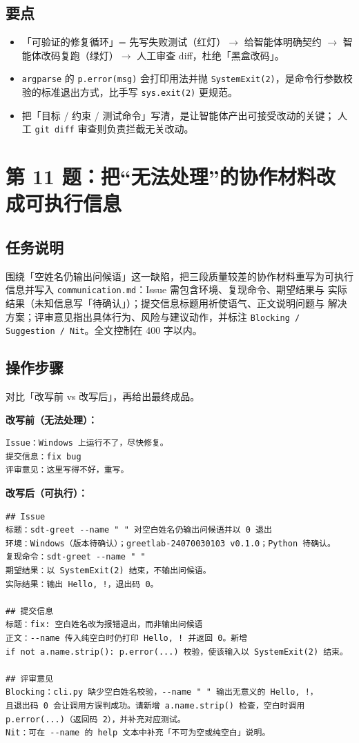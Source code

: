 \documentclass{hamesome-report}
\begin{document}
\subsection{要点}
\begin{itemize}
\item 「可验证的修复循环」= 先写失败测试（红灯）$\to$ 给智能体明确契约
  $\to$ 智能体改码复跑（绿灯）$\to$ 人工审查 diff，杜绝「黑盒改码」。
\item \texttt{argparse} 的 \texttt{p.error(msg)} 会打印用法并抛
  \texttt{SystemExit(2)}，是命令行参数校验的标准退出方式，比手写
  \texttt{sys.exit(2)} 更规范。
\item 把「目标 / 约束 / 测试命令」写清，是让智能体产出可接受改动的关键；
  人工 \texttt{git diff} 审查则负责拦截无关改动。
\end{itemize}

\section{第 11 题：把“无法处理”的协作材料改成可执行信息}
\subsection{任务说明}
围绕「空姓名仍输出问候语」这一缺陷，把三段质量较差的协作材料重写为可执行
信息并写入 \texttt{communication.md}：Issue 需包含环境、复现命令、期望结果与
实际结果（未知信息写「待确认」）；提交信息标题用祈使语气、正文说明问题与
解决方案；评审意见指出具体行为、风险与建议动作，并标注
\texttt{Blocking / Suggestion / Nit}。全文控制在 400 字以内。

\subsection{操作步骤}
对比「改写前 vs 改写后」，再给出最终成品。

\textbf{改写前（无法处理）：}
\begin{lstlisting}[language={}]
Issue：Windows 上运行不了，尽快修复。
提交信息：fix bug
评审意见：这里写得不好，重写。
\end{lstlisting}

\textbf{改写后（可执行）：}
\begin{lstlisting}[caption=communication.md（节选）]
## Issue
标题：sdt-greet --name " " 对空白姓名仍输出问候语并以 0 退出
环境：Windows（版本待确认）；greetlab-24070030103 v0.1.0；Python 待确认。
复现命令：sdt-greet --name " "
期望结果：以 SystemExit(2) 结束，不输出问候语。
实际结果：输出 Hello, !，退出码 0。

## 提交信息
标题：fix: 空白姓名改为报错退出，而非输出问候语
正文：--name 传入纯空白时仍打印 Hello, ! 并返回 0。新增
if not a.name.strip(): p.error(...) 校验，使该输入以 SystemExit(2) 结束。

## 评审意见
Blocking：cli.py 缺少空白姓名校验，--name " " 输出无意义的 Hello, !，
且退出码 0 会让调用方误判成功。请新增 a.name.strip() 检查，空白时调用
p.error(...)（返回码 2），并补充对应测试。
Nit：可在 --name 的 help 文本中补充「不可为空或纯空白」说明。
\end{lstlisting}
\end{document}
